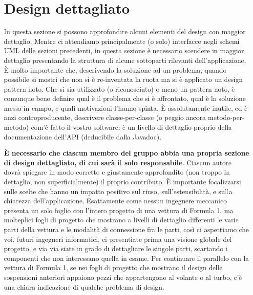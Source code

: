 \documentclass[a4paper,12pt]{report}
\begin{document}
\section{Design dettagliato}

In questa sezione si possono approfondire alcuni elementi del design con maggior dettaglio.
%
Mentre ci attendiamo principalmente (o solo) interfacce negli schemi UML delle sezioni precedenti,
in questa sezione è necessario scendere in maggior dettaglio presentando la struttura di alcune sottoparti rilevanti dell'applicazione.
%
È molto importante che, descrivendo la soluzione ad un problema, quando possibile si mostri che non si è re-inventata la ruota ma si è applicato un design pattern noto.
%
Che si sia utilizzato (o riconosciuto) o meno un pattern noto, è comunque bene definire qual è il problema che si è affrontato, qual è la soluzione messa in campo, e quali motivazioni l'hanno spinta.
%
È assolutamente inutile, ed è anzi controproducente, descrivere classe-per-classe (o peggio ancora metodo-per-metodo) com'è fatto il vostro software: è un livello di dettaglio proprio della documentazione dell'API (deducibile dalla Javadoc).

\textbf{È necessario che ciascun membro del gruppo abbia una propria sezione di design dettagliato,
di cui sarà il solo responsabile}.
%
Ciascun autore dovrà spiegare in modo corretto e giustamente approfondito (non troppo in dettaglio, non superficialmente) il proprio contributo.
%
È importante focalizzarsi sulle scelte che hanno un impatto positivo sul riuso, sull'estensibilità, e sulla chiarezza dell'applicazione.
%
Esattamente come nessun ingegnere meccanico presenta un solo foglio con l'intero progetto di una vettura di Formula 1, ma molteplici fogli di progetto che mostrano a livelli di dettaglio differenti le varie parti della vettura e le modalità di connessione fra le parti, così ci aspettiamo che voi, futuri ingegneri informatici, ci presentiate prima una visione globale del progetto, e via via siate in grado di dettagliare le singole parti, scartando i componenti che non interessano quella in esame.
%
Per continuare il parallelo con la vettura di Formula 1, se nei fogli di progetto che mostrano il
design delle sospensioni anteriori appaiono pezzi che appartengono al volante o al turbo, c'è una
chiara indicazione di qualche problema di design.
\end{document}
